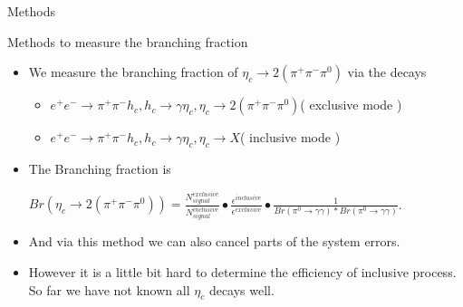 \documentclass{beamer}
\begin{document}
\begin{frame}{Methods}
    \begin{block}{Methods to measure the branching fraction}
        \begin{itemize}
            \item We measure the branching fraction of $\eta_c\to 2(\pi^+\pi^-\pi^0)$ via the decays
                \begin{itemize}
                    \item $e^+e^-\to \pi^+ \pi^- h_c, h_c\to \gamma\eta_c, \eta_c\to 2(\pi^+\pi^-\pi^0)$( exclusive mode )
                    \item $e^+e^-\to \pi^+ \pi^- h_c, h_c\to \gamma\eta_c, \eta_c\to X$( inclusive mode )
                \end{itemize}
            \item The Branching fraction is\\
                \begin{center}
                    $Br(\eta_c\to 2(\pi^+\pi^-\pi^0)) = \frac{N^{exclusive}_{signal}}{N^{inclusive}_{signal}}\bullet\frac{\epsilon^{inclusive}}{\epsilon^{exclusive}}\bullet\frac{1}{Br(\pi^0\to\gamma\gamma)*Br(\pi^0\to\gamma\gamma)}$.
                \end{center}
        \end{itemize}
    \end{block}
    \begin{block}{}
        \begin{itemize}
            \item And via this method we can also cancel parts of the system errors.
            \item However it is a little bit hard to determine the efficiency of inclusive process. So far we have not known all $\eta_c$ decays well.
        \end{itemize}
    \end{block}
\end{frame}
\end{document}
